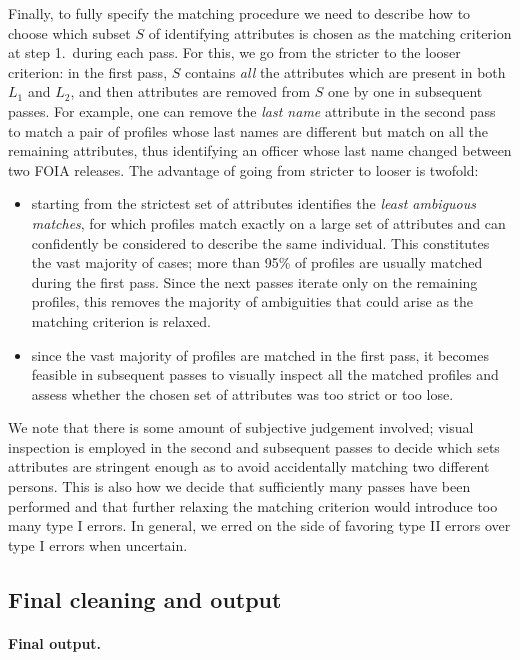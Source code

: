 Finally, to fully specify the matching procedure we need to describe how to
choose which subset $S$ of identifying attributes is chosen as the matching
criterion at step 1.\ during each pass. For this, we go from the stricter to
the looser criterion: in the first pass, $S$ contains \emph{all} the attributes
which are present in both $L_1$ and $L_2$, and then attributes are removed from
$S$ one by one in subsequent passes. For example, one can remove the \emph{last
name} attribute in the second pass to match a pair of profiles whose last names
are different but match on all the remaining attributes, thus identifying an
officer whose last name changed between two FOIA releases. The advantage of
going from stricter to looser is twofold:
\begin{itemize}
	\item starting from the strictest set of attributes identifies the
		\emph{least ambiguous matches}, for which profiles match exactly on
		a large set of attributes and can confidently be considered to describe
		the same individual. This constitutes the vast majority of cases;
		more than 95\% of profiles are usually matched during the first pass.
		Since the next passes iterate only on the remaining profiles, this
		removes the majority of ambiguities that could arise as the
		matching criterion is relaxed.
	\item since the vast majority of profiles are matched in the first pass,
		it becomes feasible in subsequent passes to visually inspect all
		the matched profiles and assess whether the chosen set of attributes was
		too strict or too lose.
\end{itemize}

We note that there is some amount of subjective judgement involved;
 visual inspection is employed in the second and subsequent passes to decide which sets
attributes are stringent enough as to avoid accidentally matching two different persons. 
This is also how we decide that sufficiently many passes have been
performed and that further relaxing the matching criterion would introduce too
many type I errors. In general, we erred on the side of favoring
type II errors over type I errors when uncertain.




\subsection{Final cleaning and output}




\paragraph{Final output.}
